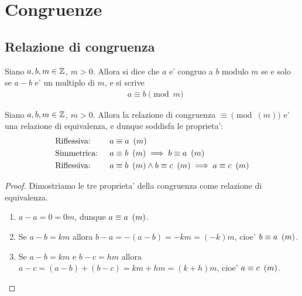 \chapter{Congruenze}

\section{Relazione di congruenza}

\begin{definition} \label{def_congr}
    Siano $a, b, m \in \mathbb{Z}$, $m > 0$. Allora si dice che $a$ e' congruo a $b$ modulo $m$ se e solo se $a - b$ e' un multiplo di $m$, e si scrive
    \begin{align*}
        &a \equiv b \pmod m
    \end{align*}
\end{definition}

\begin{theorem}
    Siano $a, b, m \in \mathbb{Z}$, $m > 0$. Allora la relazione di congruenza $\equiv \pmod(m)$ e' una relazione di equivalenza, e dunque soddisfa le proprieta':
    \begin{align}
        &\text{Riflessiva: } &&a \equiv a \ \left(m\right) \label{congr_rifl}\\
        &\text{Simmetrica: } &&a \equiv b \ \left(m\right) \implies b \equiv a \ \left(m\right) \label{congr_simm}\\
        &\text{Riflessiva: } &&a \equiv b \ \left(m\right) \land b \equiv c \ \left(m\right) \implies a \equiv c \ \left(m\right)  \label{congr_trans}
    \end{align}
\end{theorem}
\begin{proof} Dimostriamo le tre proprieta' della congruenza come relazione di equivalenza.
    \begin{enumerate}
        \item $a - a = 0 = 0m$, dunque $a \equiv a \ \left(m\right)$.
        \item Se $a - b = km$ allora $b - a = -(a - b) = -km = (-k)m$, cioe' $b \equiv a \ \left(m\right)$.
        \item Se $a - b = km$ e $b - c = hm$ allora $a - c = (a - b) + (b - c) = km + hm = (k + h)m$, 
            cioe' $a \equiv c \ \left(m\right)$.
    \end{enumerate}
\end{proof}

